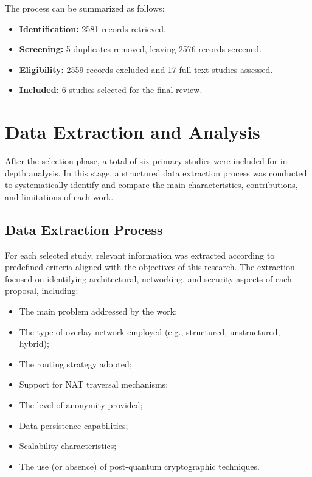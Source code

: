 \documentclass[12pt,a4paper]{article}
\begin{document}
The process can be summarized as follows:

\begin{itemize}
    \item \textbf{Identification:} 2581 records retrieved.
    \item \textbf{Screening:} 5 duplicates removed, leaving 2576 records screened.
    \item \textbf{Eligibility:} 2559 records excluded and 17 full-text studies assessed.
    \item \textbf{Included:} 6 studies selected for the final review.
\end{itemize}



\clearpage
\section{Data Extraction and Analysis}

After the selection phase, a total of six primary studies were included for in-depth analysis. In this stage, a structured data extraction process was conducted to systematically identify and compare the main characteristics, contributions, and limitations of each work.

\subsection{Data Extraction Process}

For each selected study, relevant information was extracted according to predefined criteria aligned with the objectives of this research. The extraction focused on identifying architectural, networking, and security aspects of each proposal, including:

\begin{itemize}
    \item The main problem addressed by the work;
    \item The type of overlay network employed (e.g., structured, unstructured, hybrid);
    \item The routing strategy adopted;
    \item Support for NAT traversal mechanisms;
    \item The level of anonymity provided;
    \item Data persistence capabilities;
    \item Scalability characteristics;
    \item The use (or absence) of post-quantum cryptographic techniques.
\end{itemize}
\end{document}
